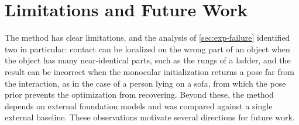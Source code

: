 \section{Limitations and Future Work}
\label{sec:conclusion-future}

The method has clear limitations, and the analysis of \cref{sec:exp-failure} identified two in particular: contact can be localized on the wrong part of an object when the object has many near-identical parts, such as the rungs of a ladder, and the result can be incorrect when the monocular initialization returns a pose far from the interaction, as in the case of a person lying on a sofa, from which the pose prior prevents the optimization from recovering. Beyond these, the method depends on external foundation models and was compared against a single external baseline. These observations motivate several directions for future work.

